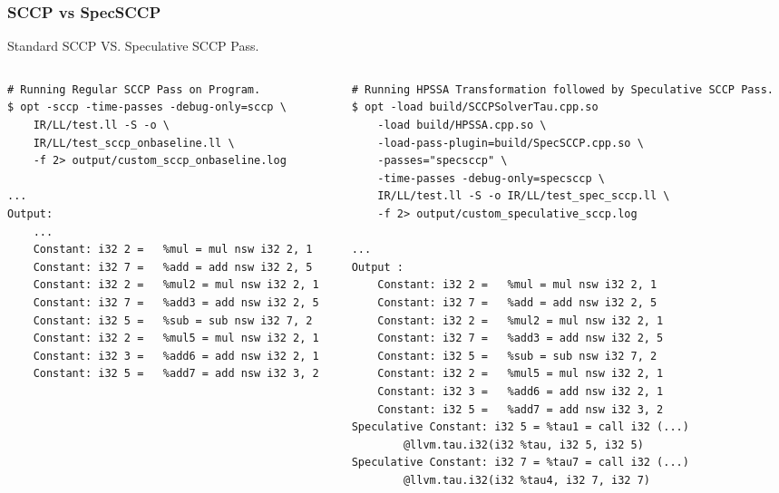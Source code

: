 \documentclass[aspectratio=169, compress]{beamer}
\begin{document}
\begin{frame}[fragile]
	\frametitle{SCCP vs SpecSCCP}
	Standard SCCP VS. Speculative SCCP Pass.
\begin{columns}
	\begin{column}{0.4\textwidth}
		\begin{verbatim}
# Running Regular SCCP Pass on Program.
$ opt -sccp -time-passes -debug-only=sccp \
	IR/LL/test.ll -S -o \
	IR/LL/test_sccp_onbaseline.ll \
	-f 2> output/custom_sccp_onbaseline.log

...
Output:
	...
	Constant: i32 2 =   %mul = mul nsw i32 2, 1
	Constant: i32 7 =   %add = add nsw i32 2, 5
	Constant: i32 2 =   %mul2 = mul nsw i32 2, 1
	Constant: i32 7 =   %add3 = add nsw i32 2, 5
	Constant: i32 5 =   %sub = sub nsw i32 7, 2
	Constant: i32 2 =   %mul5 = mul nsw i32 2, 1
	Constant: i32 3 =   %add6 = add nsw i32 2, 1
	Constant: i32 5 =   %add7 = add nsw i32 3, 2
	
	
	
	
		\end{verbatim}
	\end{column}
	\begin{column}{0.5\textwidth}  
		\begin{verbatim}
# Running HPSSA Transformation followed by Speculative SCCP Pass.
$ opt -load build/SCCPSolverTau.cpp.so 
	-load build/HPSSA.cpp.so \
	-load-pass-plugin=build/SpecSCCP.cpp.so \
	-passes="specsccp" \
	-time-passes -debug-only=specsccp \
	IR/LL/test.ll -S -o IR/LL/test_spec_sccp.ll \
	-f 2> output/custom_speculative_sccp.log
	
...
Output :
	Constant: i32 2 =   %mul = mul nsw i32 2, 1
	Constant: i32 7 =   %add = add nsw i32 2, 5
	Constant: i32 2 =   %mul2 = mul nsw i32 2, 1
	Constant: i32 7 =   %add3 = add nsw i32 2, 5
	Constant: i32 5 =   %sub = sub nsw i32 7, 2
	Constant: i32 2 =   %mul5 = mul nsw i32 2, 1
	Constant: i32 3 =   %add6 = add nsw i32 2, 1
	Constant: i32 5 =   %add7 = add nsw i32 3, 2
Speculative Constant: i32 5 = %tau1 = call i32 (...) 
		@llvm.tau.i32(i32 %tau, i32 5, i32 5)
Speculative Constant: i32 7 = %tau7 = call i32 (...) 
		@llvm.tau.i32(i32 %tau4, i32 7, i32 7)
		\end{verbatim}
	\end{column}
\end{columns}
\end{frame}
\end{document}
